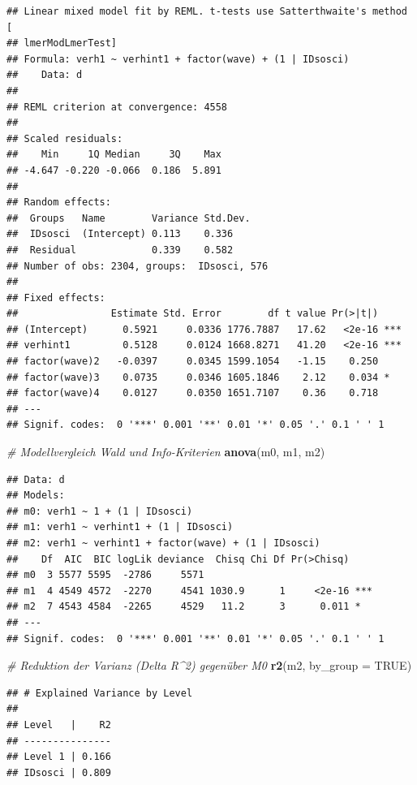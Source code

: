 \documentclass[
]{book}
\newenvironment{Shaded}{\begin{snugshade}}{\end{snugshade}}
\newcommand{\CommentTok}[1]{\textcolor[rgb]{0.56,0.35,0.01}{\textit{#1}}}
\newcommand{\DataTypeTok}[1]{\textcolor[rgb]{0.13,0.29,0.53}{#1}}
\newcommand{\KeywordTok}[1]{\textcolor[rgb]{0.13,0.29,0.53}{\textbf{#1}}}
\newcommand{\NormalTok}[1]{#1}
\newcommand{\OtherTok}[1]{\textcolor[rgb]{0.56,0.35,0.01}{#1}}
\begin{document}
\begin{verbatim}
## Linear mixed model fit by REML. t-tests use Satterthwaite's method [
## lmerModLmerTest]
## Formula: verh1 ~ verhint1 + factor(wave) + (1 | IDsosci)
##    Data: d
## 
## REML criterion at convergence: 4558
## 
## Scaled residuals: 
##    Min     1Q Median     3Q    Max 
## -4.647 -0.220 -0.066  0.186  5.891 
## 
## Random effects:
##  Groups   Name        Variance Std.Dev.
##  IDsosci  (Intercept) 0.113    0.336   
##  Residual             0.339    0.582   
## Number of obs: 2304, groups:  IDsosci, 576
## 
## Fixed effects:
##                Estimate Std. Error        df t value Pr(>|t|)    
## (Intercept)      0.5921     0.0336 1776.7887   17.62   <2e-16 ***
## verhint1         0.5128     0.0124 1668.8271   41.20   <2e-16 ***
## factor(wave)2   -0.0397     0.0345 1599.1054   -1.15    0.250    
## factor(wave)3    0.0735     0.0346 1605.1846    2.12    0.034 *  
## factor(wave)4    0.0127     0.0350 1651.7107    0.36    0.718    
## ---
## Signif. codes:  0 '***' 0.001 '**' 0.01 '*' 0.05 '.' 0.1 ' ' 1
\end{verbatim}

\begin{Shaded}
\begin{Highlighting}[]
\CommentTok{# Modellvergleich Wald und Info-Kriterien}
\KeywordTok{anova}\NormalTok{(m0, m1, m2)}
\end{Highlighting}
\end{Shaded}

\begin{verbatim}
## Data: d
## Models:
## m0: verh1 ~ 1 + (1 | IDsosci)
## m1: verh1 ~ verhint1 + (1 | IDsosci)
## m2: verh1 ~ verhint1 + factor(wave) + (1 | IDsosci)
##    Df  AIC  BIC logLik deviance  Chisq Chi Df Pr(>Chisq)    
## m0  3 5577 5595  -2786     5571                             
## m1  4 4549 4572  -2270     4541 1030.9      1     <2e-16 ***
## m2  7 4543 4584  -2265     4529   11.2      3      0.011 *  
## ---
## Signif. codes:  0 '***' 0.001 '**' 0.01 '*' 0.05 '.' 0.1 ' ' 1
\end{verbatim}

\begin{Shaded}
\begin{Highlighting}[]
\CommentTok{# Reduktion der Varianz (Delta R^2) gegenüber M0}
\KeywordTok{r2}\NormalTok{(m2, }\DataTypeTok{by_group =} \OtherTok{TRUE}\NormalTok{)}
\end{Highlighting}
\end{Shaded}

\begin{verbatim}
## # Explained Variance by Level
## 
## Level   |    R2
## ---------------
## Level 1 | 0.166
## IDsosci | 0.809
\end{verbatim}
\end{document}
